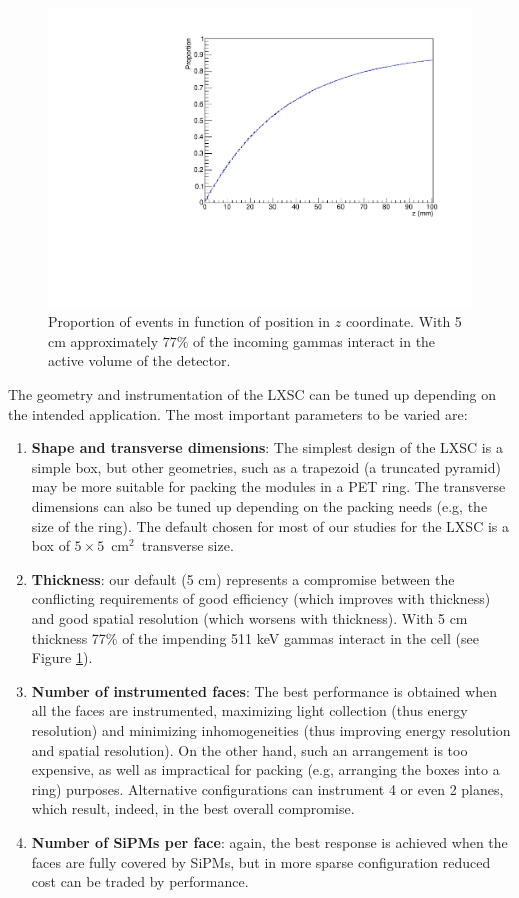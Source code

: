 \begin{figure}[!htb]
	\centering
	\includegraphics[scale=0.5]{img/zProportion.pdf}
	\caption{\label{fig.proportion} Proportion of events in function of position in $z$ coordinate. With 5 cm approximately $77\%$ of the incoming gammas interact in the active volume of the detector.}
\end{figure}


The geometry and instrumentation of the LXSC can be tuned up depending on the intended application. The most important parameters to be varied are: 
\begin{enumerate}
\item {\bf Shape and transverse dimensions}: The simplest design of the LXSC is a simple box, but other geometries, such as a trapezoid (a truncated pyramid) may be more suitable for packing the modules in a PET ring. The transverse dimensions can also be tuned up depending on the packing needs (e.g, the size of the ring). The default chosen for most of our studies for the LXSC is a box of $5 \times 5$~cm$^2$~transverse size.
\item {\bf Thickness}: our default (5 cm) represents a compromise between the conflicting requirements of good efficiency (which improves with thickness) and good spatial resolution (which worsens with thickness). With 5 cm thickness 77\% of the impending 511 keV gammas interact in the cell  (see Figure \ref{fig.proportion}).
\item {\bf Number of instrumented faces}: The best performance is obtained when all the faces are instrumented, maximizing light collection (thus energy resolution) and minimizing inhomogeneities (thus improving energy resolution and spatial resolution). On the other hand, such an arrangement is too expensive, as well as impractical for packing (e.g, arranging the boxes into a ring) purposes. Alternative configurations can instrument 4 or even 2 planes, which result, indeed, in the best overall compromise. 
\item {\bf Number of SiPMs per face}: again, the best response is achieved when the faces are fully covered by SiPMs, but in more sparse configuration reduced cost can be traded by performance.
\end{enumerate}

